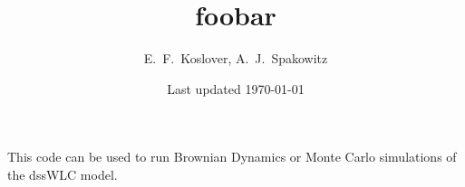 \documentclass[12pt]{article}
\begin{document}
\title{foobar}
\author{E.~F.~Koslover, A.~J.~Spakowitz}
\date{Last updated \today}
\maketitle

This code can be used to run {\color{red} Brownian Dynamics} or Monte Carlo simulations of the dssWLC model.
\end{document}

